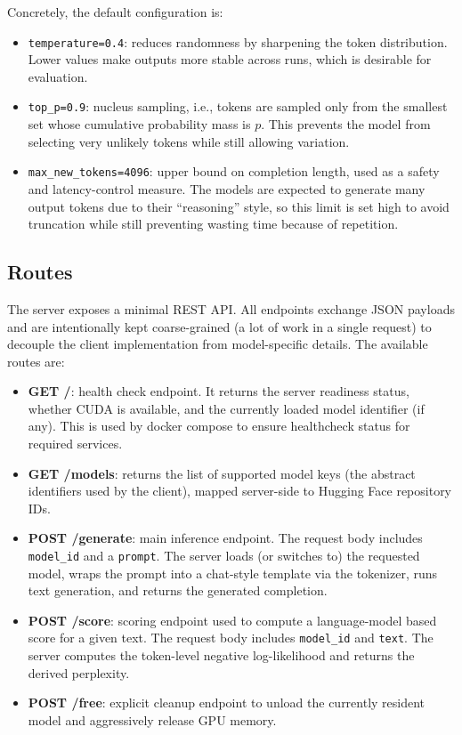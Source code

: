 Concretely, the default configuration is:
\begin{itemize}
    \item \texttt{temperature=0.4}: reduces randomness by sharpening the token distribution. Lower values make outputs more stable across runs, which is desirable for evaluation.
    \item \texttt{top\_p=0.9}: nucleus sampling, i.e., tokens are sampled only from the smallest set whose cumulative probability mass is $p$. This prevents the model from selecting very unlikely tokens while still allowing variation.
    \item \texttt{max\_new\_tokens=4096}: upper bound on completion length, used as a safety and latency-control measure. The models are expected to generate many output tokens due to their ``reasoning'' style, so this limit is set high to avoid truncation while still preventing wasting time because of repetition. 
\end{itemize}

\subsection{Routes}
The server exposes a minimal \ac{REST} \ac{API}. All endpoints exchange \ac{JSON} payloads and are intentionally kept coarse-grained (a lot of work in a single request) to decouple the client implementation from model-specific details. The available routes are:

\begin{itemize}
    \item \textbf{GET /}: health check endpoint. It returns the server readiness status, whether CUDA is available, and the currently loaded model identifier (if any). This is used by docker compose to ensure healthcheck status for required services.
    \item \textbf{GET /models}: returns the list of supported model keys (the abstract identifiers used by the client), mapped server-side to Hugging Face repository IDs.
    \item \textbf{POST /generate}: main inference endpoint. The request body includes \texttt{model\_id} and a \texttt{prompt}. The server loads (or switches to) the requested model, wraps the prompt into a chat-style template via the tokenizer, runs text generation, and returns the generated completion.
    \item \textbf{POST /score}: scoring endpoint used to compute a language-model based score for a given text. The request body includes \texttt{model\_id} and \texttt{text}. The server computes the token-level negative log-likelihood and returns the derived perplexity.
    \item \textbf{POST /free}: explicit cleanup endpoint to unload the currently resident model and aggressively release GPU memory.
\end{itemize}

